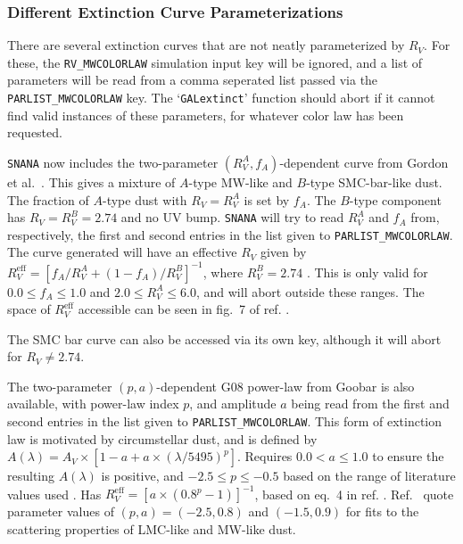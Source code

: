 \documentclass[12pt]{article}
\begin{document}
{\subsubsection{Different Extinction Curve Parameterizations}
\label{sss:GALextinc_altparam}
There are several extinction curves that are not neatly
parameterized by $R_V$. For these, the \verb!RV_MWCOLORLAW!
simulation input key will be ignored, and a list of parameters
will be read from a comma seperated list passed via the
\verb!PARLIST_MWCOLORLAW! key. The `\texttt{GALextinct}' function
should abort if it cannot find valid instances of these parameters,
for whatever color law has been requested.

\texttt{SNANA} now includes the two-parameter $(R_V^A,f_A)$-dependent curve
from Gordon et al.~\cite{Gordon2016}. This gives a mixture of $A$-type MW-like 
\cite{Fitzpatrick1999} and $B$-type SMC-bar-like \cite{Gordon2003} dust. 
The fraction of $A$-type dust with $R_V=R_V^A$ is set by $f_A$. The
$B$-type component has $R_V=R_V^B=2.74$ and no UV bump.
\texttt{SNANA} will try to read $R_V^A$ and $f_A$ from, respectively, 
the first and second entries in the list given to \verb!PARLIST_MWCOLORLAW!.
The curve generated will have an effective $R_V$ given by
$R_V^\mathrm{eff}=[f_A/R_V^A + (1-f_A)/R_V^B]^{-1}$, where $R_V^B=2.74$ 
\cite{Gordon2016}. This is only valid for $0.0\leq f_A\leq1.0$ 
and $2.0\leq R_V^A\leq6.0$, and will abort outside these ranges.
The space of $R_V^\mathrm{eff}$ accessible can be seen in 
fig.\ 7 of ref. \cite{Gordon2016}.

The SMC bar curve \cite{Gordon2003} can also be accessed via its own key, 
although it will abort for $R_V\neq2.74$.

The two-parameter $(p, a)$-dependent G08 power-law from Goobar \cite{Goobar2008}
is also available, with power-law index $p$, and amplitude $a$ being read
from the first and second entries in the list given to \texttt{PARLIST\_MWCOLORLAW}. 
This form of extinction law is motivated by circumstellar dust, and is defined by
$A(\lambda) = A_V\times[1 - a + a\times(\lambda/5495)^p]$. Requires
$0.0<a\leq 1.0$ to ensure the resulting $A(\lambda)$ is positive, and
$-2.5\leq p\leq -0.5$ based on the range of literature values used 
\cite{Goobar2008, Amanullah2015}. Has $R_V^\mathrm{eff}=[a\times (0.8^p-1)]^{-1}$,
based on eq.\ 4 in ref. \cite{Goobar2008}. Ref.\ \cite{Goobar2008} quote 
parameter values of $(p,a)=(-2.5,0.8)$ and $(-1.5, 0.9)$ for fits to the 
scattering properties of LMC-like \cite{Weingartner2001}
and MW-like \cite{Draine2003} dust.

}
\end{document}
